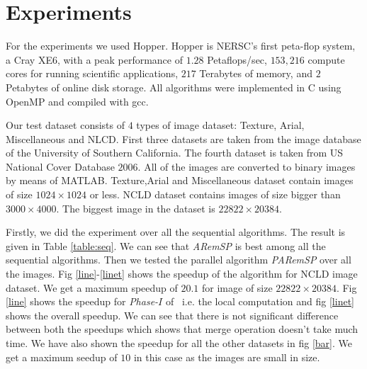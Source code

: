 \section{Experiments}
\label{sec:experiments}
For the experiments we used Hopper. Hopper is NERSC's first peta-flop system, a
Cray XE6, with a peak performance of $1.28$ Petaflops/sec, $153,216$ compute
cores for running scientific applications, $217$ Terabytes of memory, and $2$
Petabytes of online disk storage. All algorithms were implemented in C using OpenMP and compiled with gcc.

Our test dataset consists of $4$ types of image dataset: Texture, Arial,
Miscellaneous and NLCD. First three datasets are taken from the image database of the University of 
Southern California. The fourth dataset is taken from US National Cover Database
$2006$. All of the images are converted to binary images by means of MATLAB.
Texture,Arial and Miscellaneous dataset contain images of size $1024 \times
1024$ or less.
NCLD dataset contains images of size bigger than $3000 \times
4000$. The biggest image in the dataset is $22822 \times 20384$.

Firstly, we did the experiment over all the sequential algorithms. The result is given in Table \ref{table:seq}. 
We can see that {\em ARemSP} is best among all
the sequential algorithms. Then we tested the parallel algorithm {\em PARemSP} over all the images. 
Fig \ref{line}-\ref{linet} shows the speedup of the algorithm for 
NCLD image dataset. We get a maximum speedup of $20.1$ for image of size $22822 \times 20384$. 
Fig \ref{line} shows the speedup for {\em Phase-$I$} of \paremsp\ i.e. 
the local computation and fig \ref{linet} shows the overall speedup. We can see that there is not 
significant difference between both the speedups which shows that 
merge operation doesn't take much time. We have also shown the speedup for all
the other datasets in fig \ref{bar}. We get a maximum seedup of $10$ in this case as the images are small in size.  

